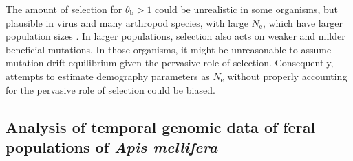 \documentclass[a4paper, 12pt]{article}
\begin{document}
The amount of selection for $\theta_{\mathrm{b}} > 1$ could be unrealistic in some organisms, but plausible in virus \citep{Feder:2014fe} and many arthropod species, with large $N_{\mathrm{e}}$, which have larger population sizes \citep[except in eusocial insects that have vertebrate-like population sizes;][]{Romiguier:2014dh}. In larger populations, selection also acts on weaker and milder beneficial mutations. In those organisms, it might be unreasonable to assume mutation-drift equilibrium given the pervasive role of selection. Consequently, attempts to estimate demography parameters as $N_{\mathrm{e}}$ without properly accounting for the pervasive role of selection could be biased.

\subsection*{Analysis of temporal genomic data of feral populations of \textit{Apis mellifera}}
\end{document}
